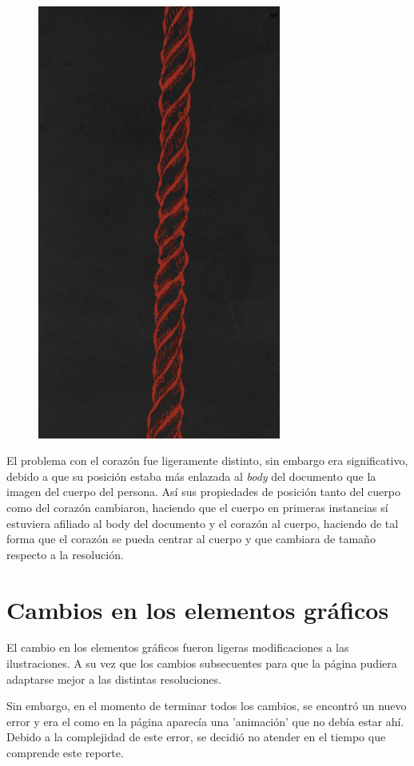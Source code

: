\documentclass[11pt,DIV=9, letterpaper, oneside, openright]{scrartcl}
\begin{document}
 \begin{figure}[h]
 \centering
 \includegraphics[width=8cm]{image.png}
 \end{figure}
 El problema con el corazón fue ligeramente distinto, sin embargo era significativo, debido a que su posición estaba más enlazada al \emph{body} del documento que la imagen del cuerpo del persona. Así sus propiedades de posición tanto del cuerpo como del corazón cambiaron, haciendo que el cuerpo en primeras instancias sí estuviera afiliado al body del documento y el corazón al cuerpo, haciendo de tal forma que el corazón se pueda centrar al cuerpo y que cambiara de tamaño respecto a la resolución.
 
 \section{Cambios en los elementos gráficos}
 El cambio en los elementos gráficos fueron ligeras modificaciones a las ilustraciones. A su vez que los cambios subsecuentes para que la página pudiera adaptarse mejor a las distintas resoluciones.

 Sin embargo, en el momento de terminar todos los cambios, se encontró un nuevo error y era el como en la página aparecía una  'animación'  que no debía estar ahí. Debido a la complejidad de este error, se decidió no atender en el tiempo que comprende este reporte.  

 

\end{document}
